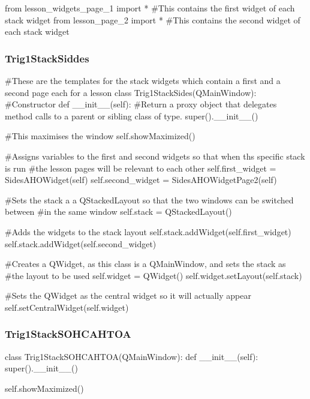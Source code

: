 \begin{landscape}
\begin{python}
from lesson_widgets_page_1 import * #This contains the first widget of each stack widget
from lesson_page_2 import * #This contains the second widget of each stack widget
\end{python}

\subsubsection{Trig1StackSiddes}

\begin{python}
#These are the templates for the stack widgets which contain a first and a second page each for a lesson
class Trig1StackSides(QMainWindow):
    #Constructor
    def __init__(self):
        #Return a proxy object that delegates method calls to a parent or sibling class of type.
        super().__init__()

        #This maximises the window
        self.showMaximized()

        #Assigns variables to the first and second widgets so that when ths specific stack is run
        #the lesson pages will be relevant to each other
        self.first_widget = SidesAHOWidget(self)
        self.second_widget = SidesAHOWidgetPage2(self)

        #Sets the stack a a QStackedLayout so that the two windows can be switched between
        #in the same window
        self.stack = QStackedLayout()

        #Adds the widgets to the stack layout
        self.stack.addWidget(self.first_widget)
        self.stack.addWidget(self.second_widget)

        #Creates a QWidget, as this class is a QMainWindow, and sets the stack as
        #the layout to be used
        self.widget = QWidget()
        self.widget.setLayout(self.stack)

        #Sets the QWidget as the central widget so it will actually appear
        self.setCentralWidget(self.widget)
\end{python}

\subsubsection{Trig1StackSOHCAHTOA}

\begin{python}
class Trig1StackSOHCAHTOA(QMainWindow):
    def __init__(self):
        super().__init__()

        self.showMaximized()
        

\end{python}
\end{landscape}
